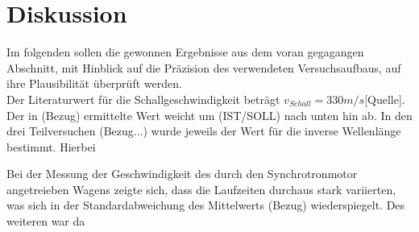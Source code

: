 \section{Diskussion}

Im folgenden sollen die gewonnen Ergebnisse aus dem voran gegagangen Abschnitt, mit Hinblick auf die Präzision
des verwendeten Versuchsaufbaus, auf ihre Plausibilität überprüft werden.  \\
Der Literaturwert für die Schallgeschwindigkeit beträgt $v_{Schall} = 330 m/s$[Quelle]. Der in (Bezug) ermittelte Wert weicht
um (IST/SOLL) nach unten hin ab.
In den drei Teilversuchen (Bezug...) wurde jeweils der Wert für die inverse Wellenlänge bestimmt. Hierbei 


Bei der Messung der Geschwindigkeit des durch den Synchrotronmotor angetreieben Wagens zeigte sich, dass die Laufzeiten
durchaus stark variierten, was sich in der Standardabweichung des Mittelwerts (Bezug) wiederspiegelt. Des weiteren war da
